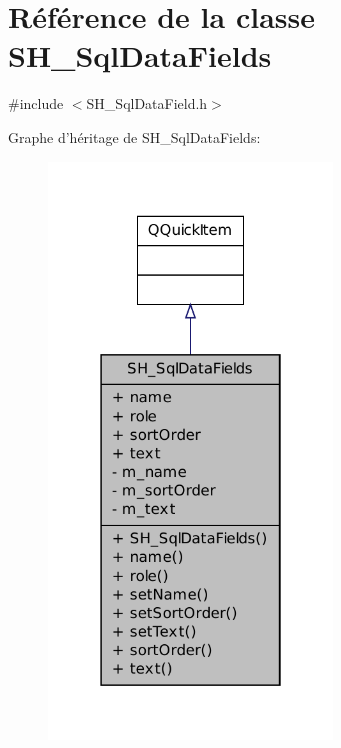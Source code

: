 \hypertarget{classSH__SqlDataFields}{\section{Référence de la classe S\-H\-\_\-\-Sql\-Data\-Fields}
\label{classSH__SqlDataFields}
}


{\ttfamily \#include $<$S\-H\-\_\-\-Sql\-Data\-Field.\-h$>$}



Graphe d'héritage de S\-H\-\_\-\-Sql\-Data\-Fields\-:\nopagebreak
\begin{figure}[H]
\begin{center}
\leavevmode
\includegraphics[width=214pt]{classSH__SqlDataFields__inherit__graph}
\end{center}
\end{figure}


